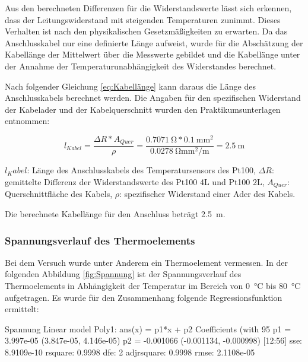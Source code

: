 Aus den berechneten Differenzen für die Widerstandswerte lässt sich erkennen, dass der Leitungswiderstand mit steigenden Temperaturen zunimmt. Dieses Verhalten ist nach den physikalischen Gesetzmäßigkeiten zu erwarten. Da das Anschlusskabel nur eine definierte Länge aufweist, wurde für die Abschätzung der Kabellänge der Mittelwert über die Messwerte gebildet und die Kabellänge unter der Annahme der Temperaturunabhängigkeit des Widerstandes berechnet. 

Nach folgender Gleichung \ref{eq:Kabellänge} kann daraus die Länge des Anschlusskabels berechnet werden. Die Angaben für den spezifischen Widerstand der Kabelader und der Kabelquerschnitt wurden den Praktikumsunterlagen entnommen:

\begin{equation}
\label{eq:Kabellänge}
l_{Kabel}= \frac{\Delta R*A_{Quer}}{\rho}=\frac{\SI{0,7071}{\ohm}*\SI{0,1}{\milli\meter\squared}}{\SI{0,0278}{\ohm\milli\meter\squared\per\meter}}=\SI{2,5}{\meter}
\end{equation}

\begin{center}
	\begin{small}
		$l_Kabel$: Länge des Anschlusskabels des Temperatursensors des Pt100,
		$\Delta R$: gemittelte Differenz der Widerstandswerte des Pt100 4L und Pt100 2L,
		$A_{Quer}$: Querschnittfläche des Kabels,
		$\rho$: spezifischer Widerstand einer Ader des Kabels.
	\end{small}
\end{center}

Die berechnete Kabellänge für den Anschluss beträgt \SI{2,5}{\meter}.

\subsubsection{Spannungsverlauf des Thermoelements}

Bei dem Versuch wurde unter Anderem ein Thermoelement vermessen. In der folgenden Abbildung \ref{fig:Spannung} ist der Spannungsverlauf des Thermoelements in Abhängigkeit der Temperatur im Bereich von \SI{0}{\celsius} bis \SI{80}{\celsius} aufgetragen. Es wurde für den Zusammenhang folgende Regressionsfunktion ermittelt:
	
Spannung
Linear model Poly1:
ans(x) = p1*x + p2
Coefficients (with 95%
p1 =   3.997e-05  (3.847e-05, 4.146e-05)
p2 =   -0.001066  (-0.001134, -0.000998)
[12:56]
sse: 8.9109e-10
rsquare: 0.9998
dfe: 2
adjrsquare: 0.9998
rmse: 2.1108e-05

